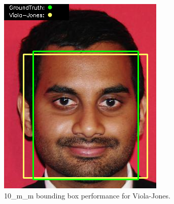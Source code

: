 \documentclass{l4proj}
\begin{document}
\begin{appendices}
\begin{figure}[h!]
  \centering
  \begin{minipage}{0.49\textwidth}
    \centering
     \includegraphics[width=\textwidth]{images/appendix/viola/10.png}
    \caption{10\_m\_m bounding box performance for Viola-Jones.}
    \label{whoopi_result}
  \end{minipage}
    \hfill
    \begin{minipage}{0.49\textwidth}
    \centering

\end{minipage}
\end{figure}
\end{appendices}
\end{document}
